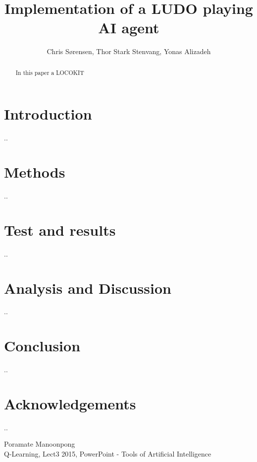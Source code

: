 \documentclass{llncs}
\begin{document}
\newpage
\title{Implementation of a LUDO playing AI agent}
\author{Chris Sørensen, Thor Stark Stenvang, Yonas Alizadeh}
\maketitle

\begin{abstract}
In this paper a LOCOKIT
\end{abstract}


\section{Introduction}
..

\newpage
\section{Methods}
..


\newpage
\section{Test and results}
..


\newpage
\section{Analysis and Discussion}
..

\newpage
\section{Conclusion}
..


\section{Acknowledgements}
..

%
\begin{thebibliography}{[1]}
%
Poramate Manoonpong\\
Q-Learning, Lect3 2015, PowerPoint - Tools of Artificial Intelligence\\


\end{thebibliography}
\end{document}
